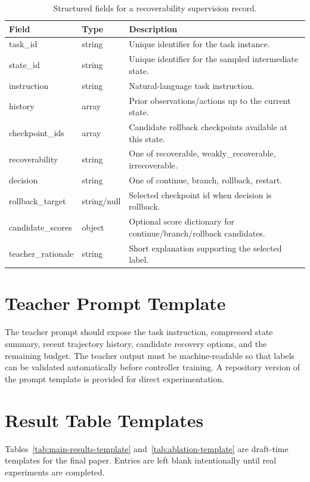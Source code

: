 \documentclass[11pt]{article}
\begin{document}
\begin{table}[t]
\centering
\small
\begin{tabular}{lll}
\toprule
Field & Type & Description \\
\midrule
task\_id & string & Unique identifier for the task instance. \\
state\_id & string & Unique identifier for the sampled intermediate state. \\
instruction & string & Natural-language task instruction. \\
history & array & Prior observations/actions up to the current state. \\
checkpoint\_ids & array & Candidate rollback checkpoints available at this state. \\
recoverability & string & One of recoverable, weakly\_recoverable, irrecoverable. \\
decision & string & One of continue, branch, rollback, restart. \\
rollback\_target & string/null & Selected checkpoint id when decision is rollback. \\
candidate\_scores & object & Optional score dictionary for continue/branch/rollback candidates. \\
teacher\_rationale & string & Short explanation supporting the selected label. \\
\bottomrule
\end{tabular}
\caption{Structured fields for a recoverability supervision record.}
\label{tab:label-schema}
\end{table}

\section{Teacher Prompt Template}
The teacher prompt should expose the task instruction, compressed state summary, recent trajectory history, candidate recovery options, and the remaining budget. The teacher output must be machine-readable so that labels can be validated automatically before controller training. A repository version of the prompt template is provided for direct experimentation.

\section{Result Table Templates}
Tables~\ref{tab:main-results-template} and~\ref{tab:ablation-template} are draft-time templates for the final paper. Entries are left blank intentionally until real experiments are completed.
\end{document}
